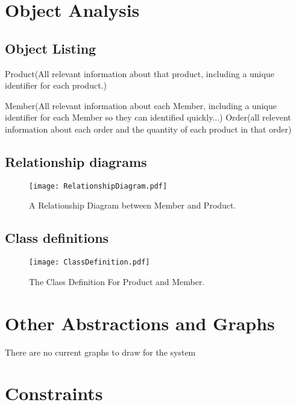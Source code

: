 \section{Object Analysis}

\subsection{Object Listing}

\begin{flushleft}
Product(All relevant information about that product, including a unique identifier for each product.)\par
Member(All relevant information about each Member, including a unique identifier for each Member so they can identified quickly...)
Order(all relevent information about each order and the quantity of each product in that order)

\end{flushleft}
\subsection{Relationship diagrams}


\begin{figure}[H]
\texttt{[image: RelationshipDiagram.pdf]}
\caption{A Relationship Diagram between Member and Product.} \label{fig:RelationshipDiagram}
\end{figure}

\subsection{Class definitions}

\begin{figure}[H]
\texttt{[image: ClassDefinition.pdf]}
\caption{The Class Definition For Product and Member.} \label{fig:ClassDefinition}
\end{figure}

\section{Other Abstractions and Graphs}

\begin{flushleft}
There are no current graphs to draw for the system
\end{flushleft}

\section{Constraints}

